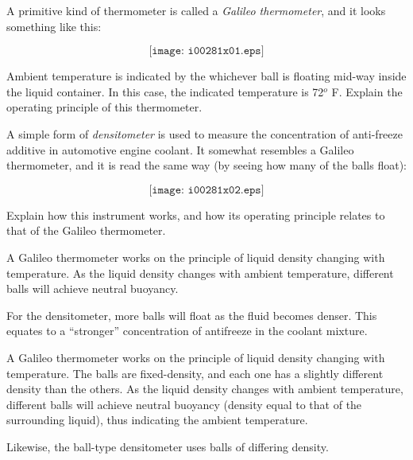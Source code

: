 

A primitive kind of thermometer is called a {\it Galileo thermometer}, and it looks something like this:

$$\texttt{[image: i00281x01.eps]}$$

Ambient temperature is indicated by the whichever ball is floating mid-way inside the liquid container.  In this case, the indicated temperature is 72$^{o}$ F.  Explain the operating principle of this thermometer.

\vskip 10pt

A simple form of {\it densitometer} is used to measure the concentration of anti-freeze additive in automotive engine coolant.  It somewhat resembles a Galileo thermometer, and it is read the same way (by seeing how many of the balls float):

$$\texttt{[image: i00281x02.eps]}$$

Explain how this instrument works, and how its operating principle relates to that of the Galileo thermometer.







A Galileo thermometer works on the principle of liquid density changing with temperature.  As the liquid density changes with ambient temperature, different balls will achieve neutral buoyancy.

\vskip 10pt

For the densitometer, more balls will float as the fluid becomes denser.  This equates to a ``stronger'' concentration of antifreeze in the coolant mixture.







A Galileo thermometer works on the principle of liquid density changing with temperature.  The balls are fixed-density, and each one has a slightly different density than the others.  As the liquid density changes with ambient temperature, different balls will achieve neutral buoyancy (density equal to that of the surrounding liquid), thus indicating the ambient temperature.

Likewise, the ball-type densitometer uses balls of differing density.




